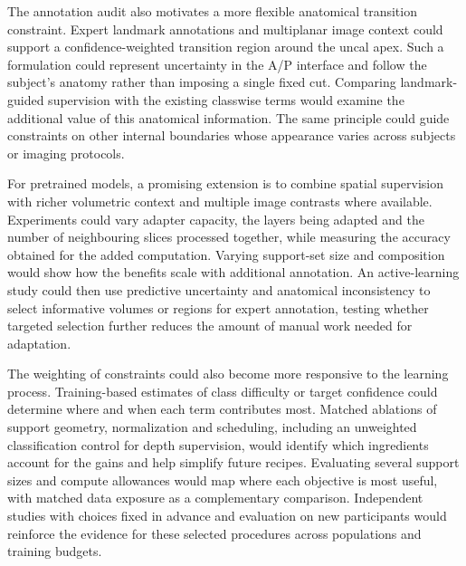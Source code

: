 \documentclass[12pt,a4paper]{article}
\begin{document}
The annotation audit also motivates a more flexible anatomical transition
constraint. Expert landmark annotations and multiplanar image context
could support a confidence-weighted transition region around the uncal
apex. Such a formulation could represent uncertainty in the A/P interface
and follow the subject's anatomy rather than imposing a single fixed
cut. Comparing landmark-guided supervision with the existing classwise
terms would examine the additional value of this anatomical information.
The same principle could guide constraints on other internal boundaries
whose appearance varies across subjects or imaging protocols.

For pretrained models, a promising extension is to combine spatial
supervision with richer volumetric context and multiple image contrasts
where available. Experiments could vary adapter capacity, the layers
being adapted and the number of neighbouring slices processed together,
while measuring the accuracy obtained for the added computation. Varying
support-set size and composition would show how the benefits scale with
additional annotation. An active-learning study could then use predictive
uncertainty and anatomical inconsistency to select informative volumes
or regions for expert annotation, testing whether targeted selection
further reduces the amount of manual work needed for adaptation.

The weighting of constraints could also become more responsive to the
learning process. Training-based estimates of class difficulty or target
confidence could determine where and when each term contributes most.
Matched ablations of support geometry, normalization and scheduling,
including an unweighted classification control for depth supervision,
would identify which ingredients account for the gains and help simplify
future recipes. Evaluating several support sizes and compute allowances
would map where each objective is most useful, with matched data exposure
as a complementary comparison. Independent studies with choices fixed in
advance and evaluation on new participants would reinforce the evidence
for these selected procedures across populations and training budgets.


\clearpage
\end{document}
